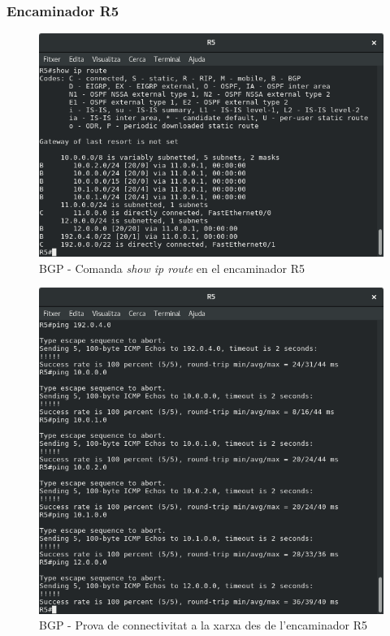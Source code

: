 \documentclass[10pt]{article}
\begin{document}
\subsubsection{Encaminador R5}
\begin{figure}[H]
\begin{center}
\includegraphics[scale=0.5]{Images/bgp-R5-route.png}
\caption{BGP - Comanda \textit{show ip route} en el encaminador R5}
\end{center}
\end{figure}
\begin{figure}[H]
\begin{center}
\includegraphics[scale=0.5]{Images/bgp-R5-conectivity.png}
\caption{BGP - Prova de connectivitat a la xarxa des de l'encaminador R5}
\end{center}
\end{figure}
\end{document}
